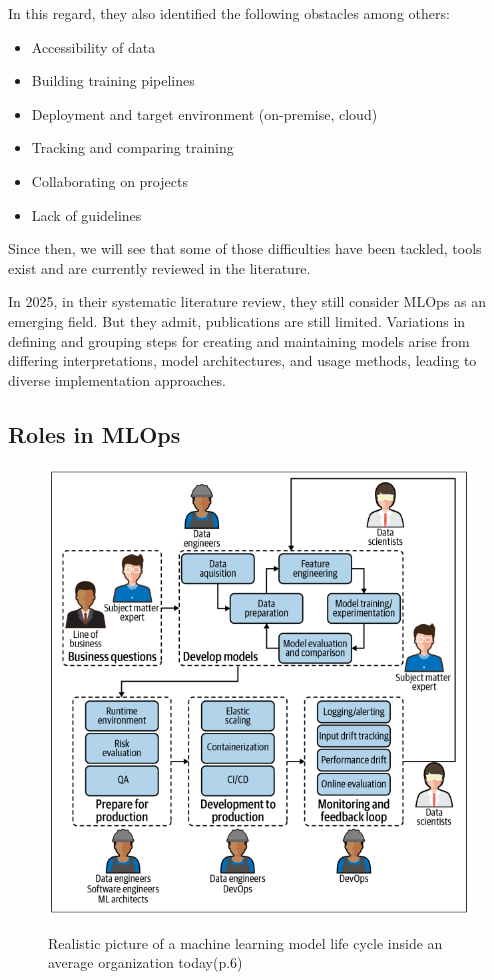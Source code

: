 In this regard, they also identified the following obstacles among others\cite{DBLP:journals/corr/abs-2103-08942}:
    \begin{itemize}
        \item Accessibility of data
        \item Building training pipelines
        \item Deployment and target environment (on-premise, cloud)
        \item Tracking and comparing training
        \item Collaborating on projects
        \item Lack of guidelines
    \end{itemize}

Since then, we will see that some of those difficulties have been tackled, tools exist and are currently reviewed in the literature.

In 2025, in their systematic literature review\cite{10855428}, they still consider MLOps as an emerging field.
But they admit, publications are still limited.
Variations in defining and grouping steps for creating and maintaining models arise from differing interpretations,
model architectures, and usage methods, leading to diverse implementation approaches.

\subsection{Roles in MLOps}\label{subsec:actors}

\begin{figure}[!htbp]
    \caption{Realistic picture of a machine learning model life cycle inside an average
    organization today\cite{treveil2020introducing}(p.6)}
    \centering
    \includegraphics[scale=0.5]{images/mlops-people}
    \label{fig:mlop-people}
\end{figure}

